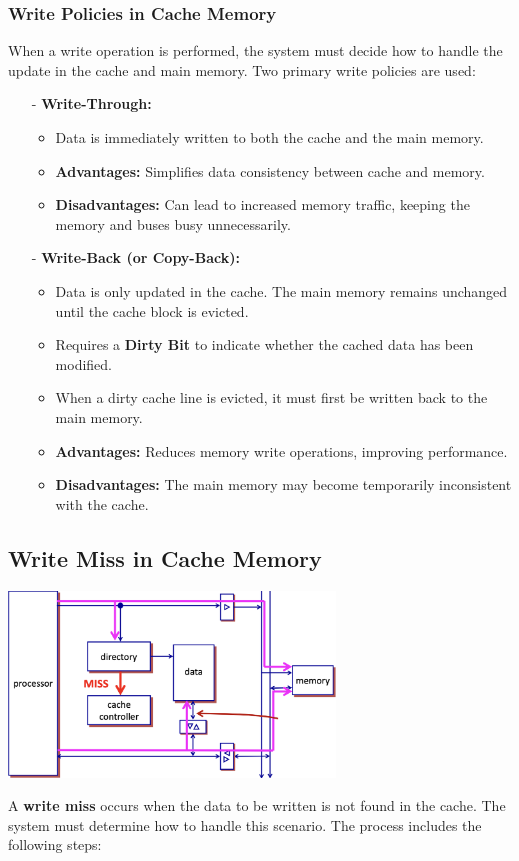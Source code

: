 \subsubsection{Write Policies in Cache Memory}
When a write operation is performed, the system must decide how to handle the update in the cache and main memory. Two primary write policies are used:

\begin{itemize}
    \item[-] \textbf{Write-Through:}
    \begin{itemize}
        \item Data is immediately written to both the cache and the main memory.
        \item \textbf{Advantages:} Simplifies data consistency between cache and memory.
        \item \textbf{Disadvantages:} Can lead to increased memory traffic, keeping the memory and buses busy unnecessarily.
    \end{itemize}

    \item[-] \textbf{Write-Back (or Copy-Back):}
    \begin{itemize}
        \item Data is only updated in the cache. The main memory remains unchanged until the cache block is evicted.
        \item Requires a \textbf{Dirty Bit} to indicate whether the cached data has been modified.
        \item When a dirty cache line is evicted, it must first be written back to the main memory.
        \item \textbf{Advantages:} Reduces memory write operations, improving performance.
        \item \textbf{Disadvantages:} The main memory may become temporarily inconsistent with the cache.
    \end{itemize}
\end{itemize}

\newpage

\subsection{Write Miss in Cache Memory}
\begin{center}
    \includegraphics[width=0.65\textwidth]{chapters/chapter3a/images/write_miss.png}
\end{center}
A \textbf{write miss} occurs when the data to be written is not found in the cache. The system must determine how to handle this scenario. The process includes the following steps:

